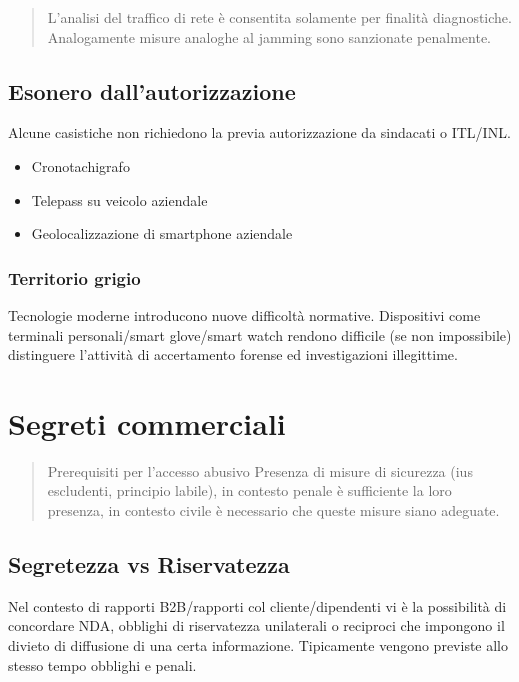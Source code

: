 \documentclass[11pt,a4paper]{article}
\begin{document}
\begin{quote}
L'analisi del traffico di rete è consentita solamente per finalità diagnostiche. Analogamente misure analoghe al jamming sono sanzionate penalmente.
\end{quote}

\subsection{Esonero dall'autorizzazione}
Alcune casistiche non richiedono la previa autorizzazione da sindacati o ITL/INL.
\begin{itemize}
    \item Cronotachigrafo
    \item Telepass su veicolo aziendale
    \item Geolocalizzazione di smartphone aziendale
\end{itemize}

\subsubsection{Territorio grigio}
Tecnologie moderne introducono nuove difficoltà normative. Dispositivi come terminali personali/smart glove/smart watch rendono difficile (se non impossibile) distinguere l'attività di accertamento forense ed investigazioni illegittime.

\section{Segreti commerciali}

\begin{quote}
Prerequisiti per l'accesso abusivo 
Presenza di  misure di sicurezza (ius escludenti, principio labile), in contesto penale è sufficiente la loro presenza, in contesto civile è necessario che queste misure siano adeguate.
\end{quote}

\subsection{Segretezza vs Riservatezza}
Nel contesto di rapporti B2B/rapporti col cliente/dipendenti vi è la possibilità di concordare NDA, obblighi di riservatezza unilaterali o reciproci che impongono il divieto di diffusione di una certa informazione. Tipicamente vengono previste allo stesso tempo obblighi e penali.
\end{document}
